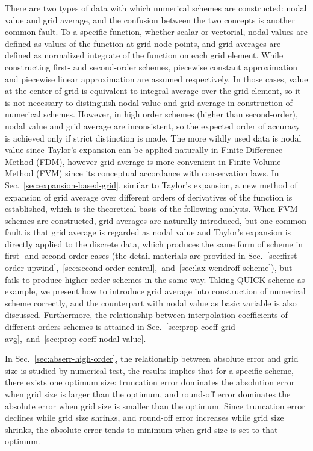 \documentclass[]{article}
\begin{document}
There are two types of data with which numerical schemes are constructed: nodal
value and grid average, and the confusion between the two concepts is another
common fault. To a specific function, whether scalar or vectorial,
nodal values are defined as values of the function at grid node points,
and grid averages are defined as normalized integrate of the function on each
grid element.
While constructing first- and second-order schemes, piecewise constant
approximation and piecewise linear approximation are assumed respectively.
In those cases, value at the center of grid is equivalent to integral average 
over the grid element, so it is not necessary to distinguish nodal value and grid
average in construction of numerical schemes. However, in high order schemes
(higher than second-order), nodal value and grid average are inconsistent,
so the expected order of accuracy is achieved only if strict distinction is made.
The more wildly used data is nodal value since Taylor's
expansion can be applied naturally in Finite Difference Method (FDM), however
grid average is more convenient in Finite Volume Method (FVM) since its
conceptual accordance with conservation laws. 
In Sec.~\ref{sec:expansion-based-grid}, similar to Taylor's expansion, a new
method of expansion of grid average over different orders of derivatives of the
function is established, which is the theoretical basis of the following
analysis. 
When FVM schemes are constructed, grid averages are naturally introduced, but 
one common fault is that grid average is regarded as nodal value
and Taylor's expansion is directly applied to the discrete data, 
which produces the same form of scheme in first- and
second-order cases (the detail materials are provided in 
Sec.~\ref{sec:first-order-upwind},~\ref{sec:second-order-central},~and~\ref{sec:lax-wendroff-scheme}),
but fails to produce higher order
schemes in the same way. Taking QUICK scheme as example, we present how to
introduce grid average into
construction of numerical scheme correctly, and the counterpart with nodal value
as basic variable is also discussed.
Furthermore, the relationship between interpolation
coefficients of different orders schemes is attained in
Sec.~\ref{sec:prop-coeff-grid-avg},~and~\ref{sec:prop-coeff-nodal-value}.

In Sec.~\ref{sec:abserr-high-order}, the relationship between
absolute error and grid size is studied by numerical test, the results
implies that for a specific scheme, there exists one optimum size:
truncation error dominates the absolution error when grid size is larger
than the optimum, and round-off error dominates the absolute error when
grid size is smaller than the optimum. Since truncation error declines while
grid size shrinks, and round-off error increases while grid size shrinks, the
absolute error tends to minimum when grid size is set to that optimum.
\end{document}
